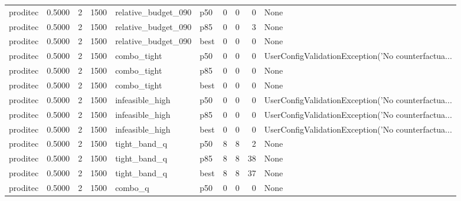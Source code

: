 \begin{tabular}{lrrrllrrrl}
proditec &    0.5000 &    2 &   1500 &  relative\_budget\_090 &    p50 &               0 &          0 &       0 &                                               None \\
proditec &    0.5000 &    2 &   1500 &  relative\_budget\_090 &    p85 &               0 &          0 &       3 &                                               None \\
proditec &    0.5000 &    2 &   1500 &  relative\_budget\_090 &   best &               0 &          0 &       0 &                                               None \\
proditec &    0.5000 &    2 &   1500 &          combo\_tight &    p50 &               0 &          0 &       0 & UserConfigValidationException('No counterfactua... \\
proditec &    0.5000 &    2 &   1500 &          combo\_tight &    p85 &               0 &          0 &       0 &                                               None \\
proditec &    0.5000 &    2 &   1500 &          combo\_tight &   best &               0 &          0 &       0 &                                               None \\
proditec &    0.5000 &    2 &   1500 &      infeasible\_high &    p50 &               0 &          0 &       0 & UserConfigValidationException('No counterfactua... \\
proditec &    0.5000 &    2 &   1500 &      infeasible\_high &    p85 &               0 &          0 &       0 & UserConfigValidationException('No counterfactua... \\
proditec &    0.5000 &    2 &   1500 &      infeasible\_high &   best &               0 &          0 &       0 & UserConfigValidationException('No counterfactua... \\
proditec &    0.5000 &    2 &   1500 &         tight\_band\_q &    p50 &               8 &          8 &       2 &                                               None \\
proditec &    0.5000 &    2 &   1500 &         tight\_band\_q &    p85 &               8 &          8 &      38 &                                               None \\
proditec &    0.5000 &    2 &   1500 &         tight\_band\_q &   best &               8 &          8 &      37 &                                               None \\
proditec &    0.5000 &    2 &   1500 &              combo\_q &    p50 &               0 &          0 &       0 &                                               None \\

\end{tabular}
